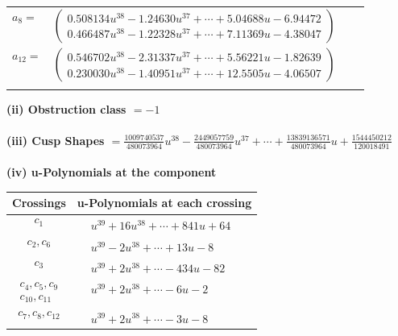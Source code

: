 \documentclass[1p]{elsarticle_modified}
\theoremstyle{definition}
\begin{document}
\begin{tabular}{m{7pt} m{180pt} m{7pt} m{180pt} }
\flushright $a_{8}=$&$\begin{pmatrix}0.508134 u^{38}-1.24630 u^{37}+\cdots+5.04688 u-6.94472\\0.466487 u^{38}-1.22328 u^{37}+\cdots+7.11369 u-4.38047\end{pmatrix}$ \\
\flushright $a_{12}=$&$\begin{pmatrix}0.546702 u^{38}-2.31337 u^{37}+\cdots+5.56221 u-1.82639\\0.230030 u^{38}-1.40951 u^{37}+\cdots+12.5505 u-4.06507\end{pmatrix}$\\&\end{tabular}
\flushleft \textbf{(ii) Obstruction class $= -1$}\\~\\
\flushleft \textbf{(iii) Cusp Shapes $= \frac{1009740537}{480073964} u^{38}-\frac{2449057759}{480073964} u^{37}+\cdots+\frac{13839136571}{480073964} u+\frac{1544450212}{120018491}$}\\~\\
\newpage\renewcommand{\arraystretch}{1}
\flushleft \textbf{(iv) u-Polynomials at the component}\newline \\
\begin{tabular}{m{50pt}|m{274pt}}
Crossings & \hspace{64pt}u-Polynomials at each crossing \\
\hline $$\begin{aligned}c_{1}\end{aligned}$$&$\begin{aligned}
&u^{39}+16 u^{38}+\cdots+841 u+64
\end{aligned}$\\
\hline $$\begin{aligned}c_{2},c_{6}\end{aligned}$$&$\begin{aligned}
&u^{39}-2 u^{38}+\cdots+13 u-8
\end{aligned}$\\
\hline $$\begin{aligned}c_{3}\end{aligned}$$&$\begin{aligned}
&u^{39}+2 u^{38}+\cdots-434 u-82
\end{aligned}$\\
\hline $$\begin{aligned}c_{4},c_{5},c_{9}\\c_{10},c_{11}\end{aligned}$$&$\begin{aligned}
&u^{39}+2 u^{38}+\cdots-6 u-2
\end{aligned}$\\
\hline $$\begin{aligned}c_{7},c_{8},c_{12}\end{aligned}$$&$\begin{aligned}
&u^{39}+2 u^{38}+\cdots-3 u-8
\end{aligned}$\\
\hline
\end{tabular}\\~\\
\end{document}
